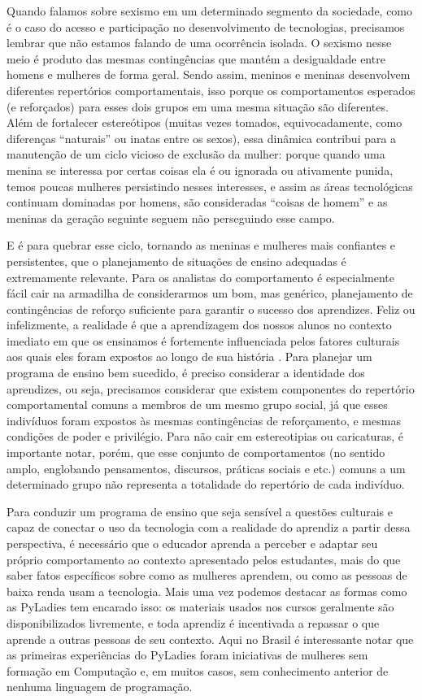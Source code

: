 Quando falamos sobre sexismo em um determinado segmento da sociedade, como é o caso do acesso e participação no desenvolvimento de tecnologias, precisamos lembrar que não estamos falando de uma ocorrência isolada. O sexismo nesse meio é produto das mesmas contingências que mantém a desigualdade entre homens e mulheres de forma geral. Sendo assim, meninos e meninas desenvolvem diferentes repertórios comportamentais, isso porque os comportamentos esperados (e reforçados) para esses dois grupos em uma mesma situação são diferentes. Além de fortalecer estereótipos (muitas vezes tomados, equivocadamente, como diferenças “naturais” ou inatas entre os sexos), essa dinâmica contribui para a manutenção de um ciclo vicioso de exclusão da mulher: porque quando uma menina se interessa por certas coisas ela é ou ignorada ou ativamente punida, temos poucas mulheres persistindo nesses interesses, e assim as áreas tecnológicas continuam dominadas por homens, são consideradas “coisas de homem” e as meninas da geração seguinte seguem não perseguindo esse campo. 

E é para quebrar esse ciclo, tornando as meninas e mulheres mais confiantes e persistentes, que o planejamento de situações de ensino adequadas é extremamente relevante. Para os analistas do comportamento é especialmente fácil cair na armadilha de considerarmos um bom, mas genérico, planejamento de contingências de reforço suficiente para garantir o sucesso dos aprendizes. Feliz ou infelizmente, a realidade é que a aprendizagem dos nossos alunos no contexto imediato em que os ensinamos é fortemente influenciada pelos fatores culturais aos quais eles foram expostos ao longo de sua história  . Para planejar um programa de ensino bem sucedido, é preciso considerar a identidade dos aprendizes, ou seja, precisamos considerar que existem componentes do repertório comportamental comuns a membros de um mesmo grupo social, já que esses indivíduos foram expostos às mesmas contingências de reforçamento, e mesmas condições de poder e privilégio. Para não cair em estereotipias ou caricaturas, é importante notar, porém, que esse conjunto de comportamentos (no sentido amplo, englobando pensamentos, discursos, práticas sociais e etc.) comuns a um determinado grupo não representa a totalidade do repertório de cada indivíduo. 

Para conduzir um programa de ensino que seja sensível a questões culturais e capaz de conectar o uso da tecnologia com a realidade do aprendiz a partir dessa perspectiva, é necessário que o educador aprenda a perceber e adaptar seu próprio comportamento ao contexto apresentado pelos estudantes, mais do que saber fatos específicos sobre como as mulheres aprendem, ou como as pessoas de baixa renda usam a tecnologia. Mais uma vez podemos destacar as formas como as PyLadies tem encarado isso: os materiais usados nos cursos geralmente são disponibilizados livremente, e toda aprendiz é incentivada a repassar o que aprende a outras pessoas de seu contexto. Aqui no Brasil é interessante notar que as primeiras experiências do PyLadies foram iniciativas de mulheres sem formação em Computação e, em muitos casos, sem conhecimento anterior de nenhuma linguagem de programação.

